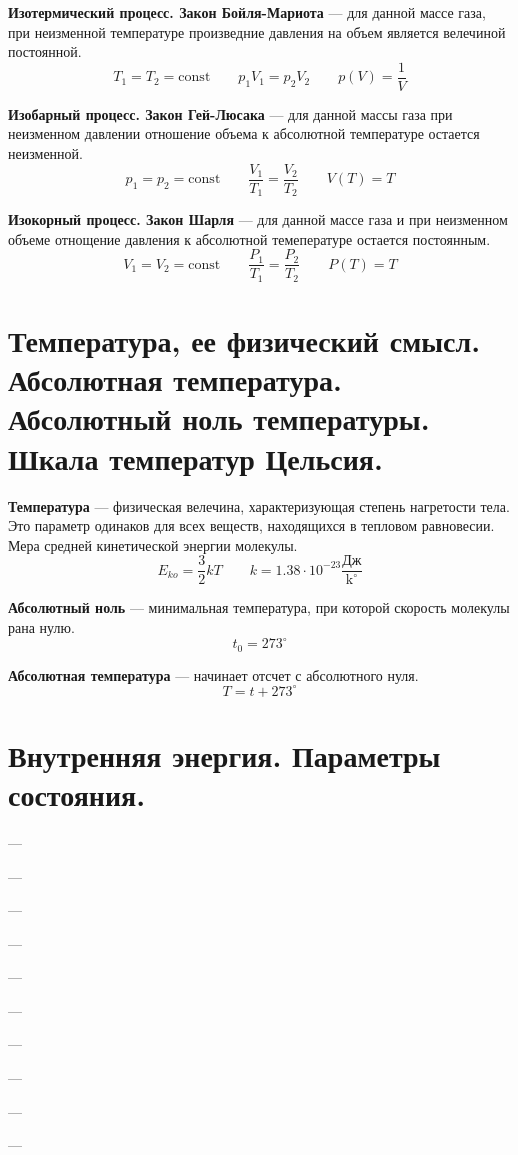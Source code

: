 \documentclass{report}
\begin{document}
{\bf Изотермический процесс. Закон Бойля-Мариота} ---
для данной массе газа, при неизменной температуре произведние давления на 
объем является велечиной постоянной.
$$
T_1=T_2=\textrm{const} \qquad 
p_1V_1=p_2V_2 \qquad 
p(V)=\frac{1}{V}
$$

{\bf Изобарный процесс. Закон Гей-Люсака} ---
для данной массы газа при неизменном давлении отношение объема к абсолютной 
температуре остается неизменной.
$$
p_1=p_2=\textrm{const} \qquad 
\frac{V_1}{T_1}=\frac{V_2}{T_2} \qquad
V(T) = T
$$

{\bf Изокорный процесс. Закон Шарля} ---
для данной массе газа и при неизменном объеме отнощение давления к абсолютной темепературе
остается постоянным.
$$
V_1=V_2=\textrm{const} \qquad 
\frac{P_1}{T_1}=\frac{P_2}{T_2} \qquad
P(T) = T
$$



\part{Температура, ее физический смысл. 
Абсолютная температура. 
Абсолютный ноль температуры. 
Шкала температур Цельсия.}

{\bf Температура} ---
физическая велечина, характеризующая степень нагретости тела. Это параметр одинаков для всех 
веществ, находящихся в тепловом равновесии. Мера средней кинетической энергии молекулы.
$$
E_{ko}=\frac{3}{2}kT \qquad k=1.38\cdot 10^{-23}\frac{\textrm{Дж}}{\textrm{k}^\circ}
$$

{\bf Абсолютный ноль} ---
минимальная температура, при которой скорость молекулы рана нулю.
$$
t_0=273^\circ
$$

{\bf Абсолютная температура} ---
начинает отсчет с абсолютного нуля.
$$
T=t+273^\circ
$$



\part{Внутренняя энергия. 
Параметры состояния.}

{\bf } ---

{\bf } ---

{\bf } ---

{\bf } ---

{\bf } ---

{\bf } ---

{\bf } ---

{\bf } ---

{\bf } ---

{\bf } ---
\end{document}
